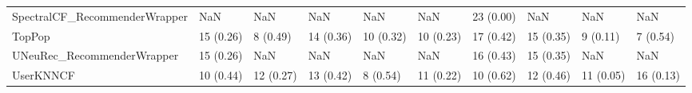 \begin{tabular}{llllllllll}
      SpectralCF\_RecommenderWrapper &                      NaN &         NaN &           NaN &          NaN &                  NaN &           23 (0.00) &               NaN &                NaN &               NaN \\
                             TopPop &                15 (0.26) &    8 (0.49) &     14 (0.36) &    10 (0.32) &            10 (0.23) &           17 (0.42) &         15 (0.35) &           9 (0.11) &          7 (0.54) \\
         UNeuRec\_RecommenderWrapper &                15 (0.26) &         NaN &           NaN &          NaN &                  NaN &           16 (0.43) &         15 (0.35) &                NaN &               NaN \\
                          UserKNNCF &                10 (0.44) &   12 (0.27) &     13 (0.42) &     8 (0.54) &            11 (0.22) &           10 (0.62) &         12 (0.46) &          11 (0.05) &         16 (0.13) \\
\bottomrule
\end{tabular}
